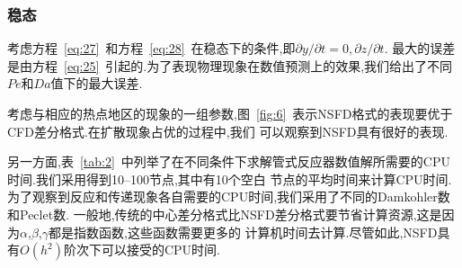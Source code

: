 \documentclass[a4paper,cs4size,adobefonts,cm-default,no-math]{ctexart}
\begin{document}
\subsubsection{稳态}
考虑方程~\ref{eq:27}~和方程~\ref{eq:28}~在稳态下的条件,即$\partial y/\partial t=0,\partial z/\partial t$.
最大的误差是由方程~\ref{eq:25}~引起的.为了表现物理现象在数值预测上的效果,我们给出了不同$Pe$和$Da$值下的最大误差.\par
考虑与相应的热点地区的现象的一组参数,图~\ref{fig:6}~表示NSFD格式的表现要优于CFD差分格式.在扩散现象占优的过程中,我们
可以观察到NSFD具有很好的表现.\par
另一方面,表~\ref{tab:2}~中列举了在不同条件下求解管式反应器数值解所需要的CPU时间.我们采用得到10--100节点,其中有10个空白
节点的平均时间来计算CPU时间.为了观察到反应和传递现象各自需要的CPU时间,我们采用了不同的Damkohler数和Peclet数.
一般地,传统的中心差分格式比NSFD差分格式要节省计算资源,这是因为$\alpha$,$\beta$,$\gamma$都是指数函数,这些函数需要更多的
计算机时间去计算.尽管如此,NSFD具有$O(h^2)$阶次下可以接受的CPU时间.
\end{document}
